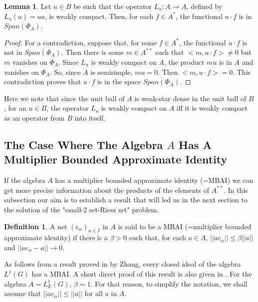\documentclass[12pt, twoside, leqno]{article}
\theoremstyle{definition}
\newtheorem{lemma}[theorem]{Lemma}
\newtheorem{definition}[theorem]{Definition}
\theoremstyle{definition}
\numberwithin{equation}{section}
\begin{document}
\begin{lemma}
	Let $ u\in B $ be such that the operator $ L_{u}:A\rightarrow A $, defined by $ L_{u}(a)=ua $, is weakly compact. Then, for each $ f\in A^{*} $, the functional $ u\cdot f $ is in $ \overline{Span(\Phi_{A})} $.
\end{lemma}
\begin{proof}
	For a contradiction, suppose that, for some $ f\in A^{*} $, the functional $ u\cdot f $ is not in $ \overline{Span(\Phi_{A})} $. Then there is some $m\in A^{**} $ such that $ <m,u\cdot f>\ne 0 $ but $ m $ vanishes on $ \Phi_{A} $. Since $ L_{u} $ is weakly compact on $ A $, the product $ mu $ is in $ A $ and vanishes on $ \Phi_{A} $. So, since $ A $ is semisimple, $ mu=0 $. Then $ <m,u\cdot f>=0 $. This contradiction proves that $ u\cdot f $ is in the space $ \overline{Span(\Phi_{A})} $.
\end{proof}
Here we note that since the unit ball of $ A $ is weak-star dense in the unit ball of $ B $, for an $ u\in B $, the operator $ L_{u} $ is weakly compact on $ A $ iff it is weakly compact as an operator from $ B $ into itself.

\subsection{The Case Where The Algebra $ A $ Has A Multiplier Bounded Approximate Identity} If the algebra $ A $ has a multiplier bounded approximate identity (=MBAI) we can get more precise information about the products of the elements of $ A^{**} $. In this subsection our aim is to establish a result that will led us in the next section to the solution of the "small-2 set-Riesz set" problem. 

\begin{definition} A net $ (e_{\alpha})_{\alpha\in I} $ in $ A $ is said to be a MBAI (=multiplier bounded approximate identity) if there is a $ \beta>0 $ such that, for each $ a\in A $, $ ||ae_{\alpha}||\leq\beta||a|| $ and $ ||ae_{\alpha}-a||\rightarrow 0 $.	
\end{definition}
As follows from a result proved in \cite [Proposition 1]{Zhang} by Zhang, every closed ideal of the algebra $ L^{1}(G) $ has a MBAI. A short direct proof of this result is also given in \cite{Esmailvandi_Filali_Galindo}. For the algebra $ A=L^{1}_{E}(G) $, $ \beta=1 $. For that reason, to simplify the notation, we shall assume that $||ae_{\alpha}||\leq||a|| $ for all $ a $ in $ A $. \\
\end{document}
